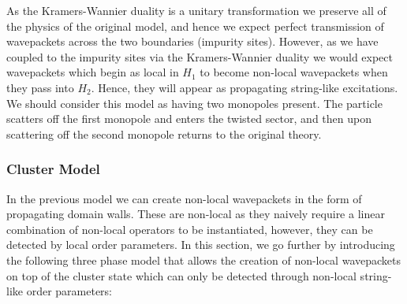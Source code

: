 \documentclass[aps,floatfix,10pt,amssymb,amsfont,amsmath,superscriptaddress,float,nofootinbib,longbibliography,nobalancelastpage,twocolumn,prx]{revtex4-2}
\begin{document}
As the Kramers-Wannier duality is a unitary transformation we preserve all of the physics of the original model, and hence we expect perfect transmission of wavepackets across the two boundaries (impurity sites). However, as we have coupled to the impurity sites via the Kramers-Wannier duality we would expect wavepackets which begin as local in $H_1$ to become non-local wavepackets when they pass into $H_2$. Hence, they will appear as propagating string-like excitations. We should consider this model as having two monopoles present. The particle scatters off the first monopole and enters the twisted sector, and then upon scattering off the second monopole returns to the original theory.

\subsubsection{Cluster Model}
In the previous model we can create non-local wavepackets in the form of propagating domain walls. These are non-local as they naively require a linear combination of non-local operators to be instantiated, however, they can be detected by local order parameters. In this section, we go further by introducing the following three phase model that allows the creation of non-local wavepackets on top of the cluster state which can only be detected through non-local string-like order parameters:
\end{document}
